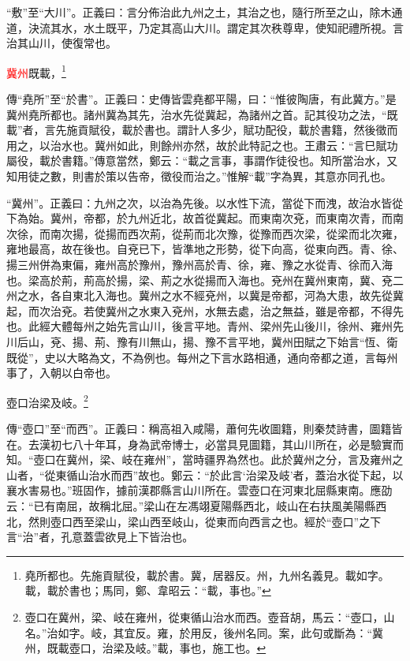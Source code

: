 {\noindent\shu{}\fzkt “敷”至“大川”。正義曰：言分佈治此九州之土，其治之也，隨行所至之山，除木通道，決流其水，水土既平，乃定其高山大川。謂定其次秩尊卑，使知祀禮所視。言治其山川，使復常也。 \par}

\textcolor{red}{冀州}既載，\footnote{堯所都也。先施貢賦役，載於書。冀，居器反。州，九州名義見。載如字。載，載於書也；馬同，鄭、韋昭云：“載，事也。”}

{\noindent\zhuan{}\fzbyks 傳“堯所”至“於書”。正義曰：史傳皆雲堯都平陽，曰：“惟彼陶唐，有此冀方。”是冀州堯所都也。諸州冀為其先，治水先從冀起，為諸州之首。記其役功之法，“既載”者，言先施貢賦役，載於書也。謂計人多少，賦功配役，載於書籍，然後徵而用之，以治水也。冀州如此，則餘州亦然，故於此特記之也。王肅云：“言巳賦功屬役，載於書籍。”傳意當然，鄭云：“載之言事，事謂作徒役也。知所當治水，又知用徒之數，則書於策以告帝，徵役而治之。”惟解“載”字為異，其意亦同孔也。 \par}

{\noindent\shu{}\fzkt “冀州”。正義曰：九州之次，以治為先後。以水性下流，當從下而洩，故治水皆從下為始。冀州，帝都，於九州近北，故首從冀起。而東南次兗，而東南次青，而南次徐，而南次揚，從揚而西次荊，從荊而北次豫，從豫而西次梁，從梁而北次雍，雍地最高，故在後也。自兗已下，皆準地之形勢，從下向高，從東向西。青、徐、揚三州併為東偏，雍州高於豫州，豫州高於青、徐，雍、豫之水從青、徐而入海也。梁高於荊，荊高於揚，梁、荊之水從揚而入海也。兗州在冀州東南，冀、兗二州之水，各自東北入海也。冀州之水不經兗州，以冀是帝都，河為大患，故先從冀起，而次治兗。若使冀州之水東入兗州，水無去處，治之無益，雖是帝都，不得先也。此經大體每州之始先言山川，後言平地。青州、梁州先山後川，徐州、雍州先川后山，兗、揚、荊、豫有川無山，揚、豫不言平地，冀州田賦之下始言“恆、衛既從”，史以大略為文，不為例也。每州之下言水路相通，通向帝都之道，言每州事了，入朝以白帝也。 \par}

壺口治梁及岐。\footnote{壺口在冀州，梁、岐在雍州，從東循山治水而西。壺音胡，馬云：“壺口，山名。”治如字。岐，其宜反。雍，於用反，後州名同。案，此句或斷為：“冀州，既載壺口，治梁及岐。”載，事也，施工也。}

{\noindent\zhuan{}\fzbyks 傳“壺口”至“而西”。正義曰：稱高祖入咸陽，蕭何先收圖籍，則秦焚詩書，圖籍皆在。去漢初七八十年耳，身為武帝博士，必當具見圖籍，其山川所在，必是驗實而知。“壺口在冀州，梁、岐在雍州”，當時疆界為然也。此於冀州之分，言及雍州之山者，“從東循山治水而西”故也。鄭云：“於此言‘治梁及岐’者，蓋治水從下起，以襄水害易也。”班固作，據前漢郡縣言山川所在。雲壺口在河東北屈縣東南。應劭云：“已有南屈，故稱北屈。”梁山在左馮翊夏陽縣西北，岐山在右扶風美陽縣西北，然則壺口西至梁山，梁山西至岐山，從東而向西言之也。經於“壺口”之下言“治”者，孔意蓋雲欲見上下皆治也。 \par}

